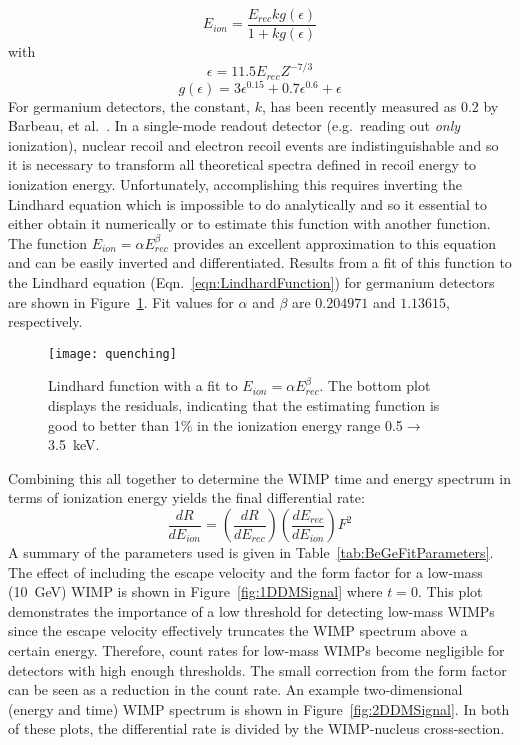 		\begin{equation}
			E_{ion} =  \frac{E_{rec} k g(\epsilon)}{1 + k g(\epsilon)}
			\label{eqn:LindhardFunction}
		\end{equation}
with 
		\[
			\epsilon =  11.5 E_{rec} Z^{-7/3}
		\]
		\[
			g(\epsilon) = 3 \epsilon^{0.15} + 0.7\epsilon^{0.6} + \epsilon
		\]
For germanium detectors, the constant, $k$, has been recently measured as 0.2 by Barbeau, et al.~\cite{Barbeau:2009fk}.  In a single-mode readout detector (e.g.~reading out \emph{only} ionization), nuclear recoil and electron recoil events are indistinguishable and so it is necessary to transform all theoretical spectra defined in recoil energy to ionization energy.  Unfortunately, accomplishing this requires inverting the Lindhard equation which is impossible to do analytically and so it essential to either obtain it numerically or to estimate this function with another function.  The function $E_{ion} =  \alpha E_{rec}^{\beta}$ provides an excellent approximation to this equation and can be easily inverted and differentiated.  Results from a fit of this function to the Lindhard equation (Eqn.~\ref{eqn:LindhardFunction}) for germanium detectors are shown in Figure~\ref{fig:LindhardFitResults}.  Fit values for $\alpha$ and $\beta$ are $0.204971$ and $1.13615$, respectively.

		\begin{figure}
			\centering
			\texttt{[image: quenching]}
			\caption[Lindhard function with a fit to $E_{ion} =  \alpha E_{rec}^{\beta}$]
			{Lindhard function with a fit to $E_{ion} =  \alpha E_{rec}^{\beta}$.  
			The bottom plot displays the residuals, 
			indicating that the estimating function is good to better than 1\% in the 
			ionization energy range 0.5$\to$3.5~keV.}
			\label{fig:LindhardFitResults}
		\end{figure}
Combining this all together to determine the WIMP time and energy spectrum in terms of ionization energy yields the final differential rate:
		\begin{equation}
				\frac{dR}{dE_{ion}}  = \left(\frac{dR}{dE_{rec}} \right) \left(\frac{dE_{rec}}{dE_{ion}} \right) F^{2}
			\label{eqn:FinalFitSpectrum}
		\end{equation}	
A summary of the parameters used is given in Table~\ref{tab:BeGeFitParameters}.  The effect of including the escape velocity and the form factor for a low-mass (10~GeV) WIMP is shown in Figure~\ref{fig:1DDMSignal} where $t=0$.  This plot demonstrates the importance of a low threshold for detecting low-mass WIMPs since the escape velocity effectively truncates the WIMP spectrum above a certain energy.  Therefore, count rates for low-mass WIMPs become negligible for detectors with high enough thresholds.  The small correction from the form factor can be seen as a reduction in the count rate.  An example two-dimensional (energy and time) WIMP spectrum is shown in Figure~\ref{fig:2DDMSignal}.  In both of these plots, the differential rate is divided by the WIMP-nucleus cross-section.

